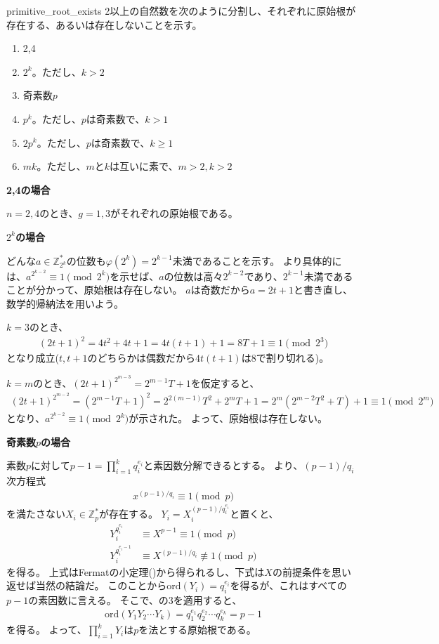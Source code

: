 \begin{prProof}{primitive_root_exists}
2以上の自然数を次のように分割し、それぞれに原始根が存在する、あるいは存在しないことを示す。
\begin{enumerate}
 \item 2,4
 \item $2^k$。ただし、$k>2$
 \item 奇素数$p$
 \item $p^k$。ただし、$p$は奇素数で、$k>1$
 \item $2p^k$。ただし、$p$は奇素数で、$k\ge1$
 \item $mk$。ただし、$m$と$k$は互いに素で、$m>2, k>2$
\end{enumerate}

\noindent\textbf{2,4の場合}

$n=2,4$のとき、$g=1,3$がそれぞれの原始根である。

\noindent\textbf{$2^k$の場合}

どんな$a\in\mathbb{Z}_{2^k}^*$の位数も$\varphi(2^k)=2^{k-1}$未満であることを示す。
より具体的には、$a^{2^{k-2}}\equiv1\pmod{2^k}$を示せば、$a$の位数は高々$2^{k-2}$であり、$2^{k-1}$未満であることが分かって、原始根は存在しない。
$a$は奇数だから$a=2t+1$と書き直し、数学的帰納法を用いよう。

$k=3$のとき、
\begin{align*}
(2t + 1)^2 = 4t^2 + 4t + 1 = 4t(t+1) + 1 = 8T + 1 \equiv 1 \pmod{2^3}
\end{align*}
となり成立($t, t+1$のどちらかは偶数だから$4t(t+1)$は8で割り切れる)。

$k=m$のとき、$(2t+1)^{2^{m-3}}=2^{m-1}T+1$を仮定すると、
\begin{align*}
(2t + 1)^{2^{m-2}} = (2^{m-1}T+1)^2 = 2^{2(m-1)}T^2 + 2^mT + 1 = 2^m(2^{m-2}T^2 + T) + 1 \equiv 1 \pmod{2^m}
\end{align*}
となり、$a^{2^{k-2}}\equiv1\pmod{2^k}$が示された。
よって、原始根は存在しない。

\noindent\textbf{奇素数$p$の場合}

素数$p$に対して$p-1=\prod_{i=1}^kq_i^{e_i}$と素因数分解できるとする。
より、$(p-1)/q_i$次方程式
\begin{align*}
x^{(p-1)/q_i} \equiv 1 \pmod{p}
\end{align*}
を満たさない$X_i\in\mathbb{Z}_p^*$が存在する。
$Y_i=X_i^{(p-1)/q_i^{e_i}}$と置くと、
\begin{align*}
Y_i^{q_i^{e_i}} &\equiv X^{p-1} \equiv 1 \pmod{p}\\
Y_i^{q_i^{e_i-1}} &\equiv X^{(p-1)/q_i} \not\equiv 1 \pmod{p}
\end{align*}
を得る。
上式はFermatの小定理()から得られるし、下式は$X$の前提条件を思い返せば当然の結論だ。
このことから$\mbox{ord}(Y_i)=q_i^{e_i}$を得るが、これはすべての$p-1$の素因数に言える。
そこで、の3を適用すると、
\begin{align*}
\mbox{ord}(Y_1Y_2\cdots Y_k) = q_1^{e_1}q_2^{e_2} \cdots q_k^{e_k} = p-1
\end{align*}
を得る。
よって、$\prod_{i=1}^k Y_i$は$p$を法とする原始根である。


\end{prProof}
